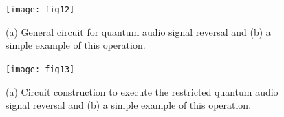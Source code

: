 \documentclass[10pt,journal,compsoc]{IEEEtran}
\begin{document}
\begin{figure}[!t]
\centering
\texttt{[image: fig12]}
\caption{(a) General circuit for quantum audio signal reversal and (b) a simple example of this operation.}
\label{fig12}
\end{figure}

\begin{figure}[!t]
\centering
\texttt{[image: fig13]}
\caption{(a) Circuit construction to execute the restricted quantum audio signal reversal and (b) a simple example of this operation.}
\label{fig13}
\end{figure}


%
%

\end{document}

